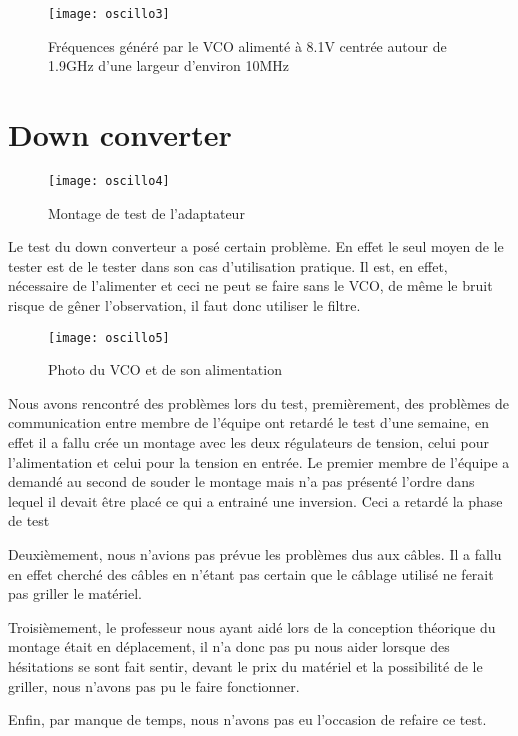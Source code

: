 \begin{figure}[h]
  \centering
  \texttt{[image: oscillo3]}
  \caption{Fréquences généré par le VCO alimenté à 8.1V centrée autour de 1.9GHz d’une largeur d’environ 10MHz}
  \label{fig:freq}
\end{figure}
\newpage
\section{Down converter}
\label{sec:down_converter}



\begin{figure}[h]
  \centering
  \texttt{[image: oscillo4]}
  \caption{Montage de test de l’adaptateur}
  \label{fig:mont}
\end{figure}


Le test du down converteur a posé certain problème. En effet le seul moyen de le tester est de le tester dans son cas d’utilisation pratique. Il est, en effet, nécessaire de l’alimenter et  ceci ne peut se faire sans le VCO, de même le bruit risque de gêner l’observation, il faut donc utiliser le filtre.


\begin{figure}[h]
  \centering
  \texttt{[image: oscillo5]}
  \caption{Photo du VCO et de son alimentation}
  \label{fig:photo}
\end{figure}



Nous avons rencontré des problèmes lors du test, premièrement, des problèmes de communication entre membre de l’équipe ont retardé le test d’une semaine, en effet il a fallu crée un montage avec les deux régulateurs de tension, celui pour l’alimentation et celui pour la tension en entrée. Le premier membre de l’équipe a demandé au second de souder le montage mais n’a pas présenté l’ordre dans lequel il devait être placé ce qui a entrainé une inversion. Ceci a retardé la phase de test

Deuxièmement, nous n’avions pas prévue les problèmes dus aux câbles. Il a fallu en effet cherché des câbles en n’étant pas certain que le câblage utilisé ne ferait pas griller le matériel.

Troisièmement, le professeur nous ayant aidé lors de la conception théorique du montage était en déplacement, il n’a donc pas pu nous aider lorsque des hésitations se sont fait sentir, devant le prix du matériel et la possibilité de le griller, nous n’avons pas pu le faire fonctionner.

Enfin, par manque de temps, nous n’avons pas eu l’occasion de refaire ce test.




